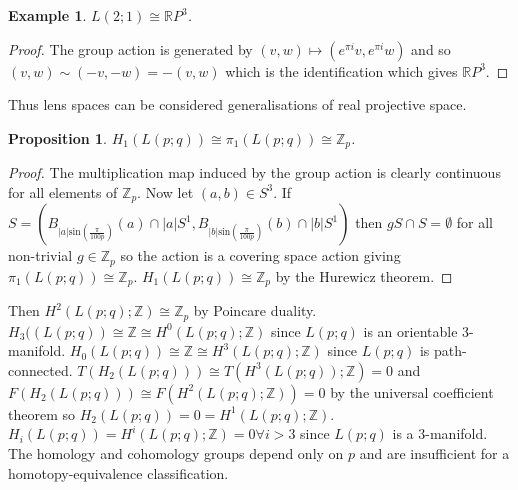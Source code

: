 \documentclass{article}
\newtheorem{proposition}[theorem]{Proposition}
\newtheorem{example}[theorem]{Example}
\begin{document}
\begin{example}
$L(2;1)\cong\mathbb{R}P^3$.
\end{example}
\begin{proof}
The group action is generated by $(v,w)\mapsto(e^{\pi i}v,e^{\pi i}w)$ and so $(v,w)\sim(-v,-w)=-(v,w)$ which is the identification which gives $\mathbb{R}P^3$.
\end{proof}

\noindent Thus lens spaces can be considered generalisations of real projective space.

\begin{proposition}
$H_1(L(p;q))\cong\pi_1(L(p;q))\cong \mathbb{Z}_p$.
\end{proposition}
\begin{proof}
The multiplication map induced by the group action is clearly continuous for all elements of $\mathbb{Z}_p$.
Now let $(a,b)\in S^3$. If $S=(B_{|a|\text{sin}(\frac{\pi}{100p})}(a)\cap |a|S^1,B_{|b|\text{sin}(\frac{\pi}{100p})}(b)\cap |b|S^1)$ then $gS\cap S=\emptyset$ for all non-trivial $g\in \mathbb{Z}_p$ so the action is a covering space action giving $\pi_1(L(p;q))\cong \mathbb{Z}_p$. $H_1(L(p;q))\cong \mathbb{Z}_p$ by the Hurewicz theorem.
\end{proof}

\noindent Then $H^2(L(p;q);\mathbb{Z})\cong\mathbb{Z}_p$ by Poincare duality. $H_3((L(p;q))\cong\mathbb{Z}\cong H^0(L(p;q);\mathbb{Z})$ since $L(p;q)$ is an orientable 3-manifold. $H_0(L(p;q))\cong\mathbb{Z}\cong H^3(L(p;q);\mathbb{Z})$ since $L(p;q)$ is path-connected. $T(H_2(L(p;q)))\cong T(H^3(L(p;q));\mathbb{Z})=0$ and $F(H_2(L(p;q)))\cong F(H^2(L(p;q);\mathbb{Z}))=0$ by the universal coefficient theorem so $H_2(L(p;q))=0=H^1(L(p;q);\mathbb{Z})$. $H_i(L(p;q))=H^i(L(p;q);\mathbb{Z})=0\forall i>3$ since $L(p;q)$ is a 3-manifold. The homology and cohomology groups depend only on $p$ and are insufficient for a homotopy-equivalence classification.
\end{document}
